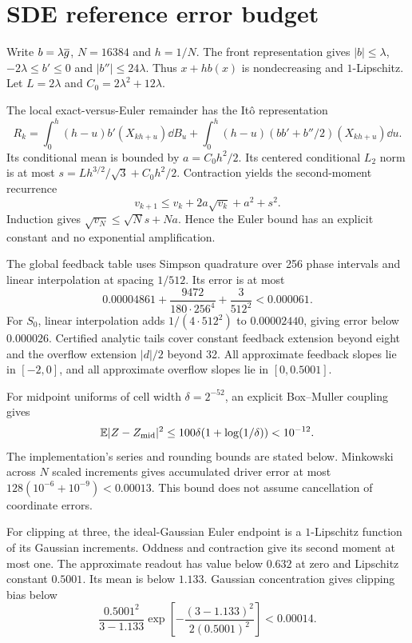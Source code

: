 \section{SDE reference error budget}\label{app:sdebudget}
Write $b=\lambda\overline g$, $N=16384$ and $h=1/N$. The front representation gives $|b|\le\lambda$, $-2\lambda\le b'\le0$ and $|b''|\le24\lambda$. Thus $x+hb(x)$ is nondecreasing and $1$-Lipschitz. Let $L=2\lambda$ and $C_0=2\lambda^2+12\lambda$.

The local exact-versus-Euler remainder has the It\^o representation
\[
 R_k=\int_0^h(h-u)b'(X_{kh+u})\dd B_u
 +\int_0^h(h-u)(bb'+b''/2)(X_{kh+u})\dd u.
\]
Its conditional mean is bounded by $a=C_0h^2/2$. Its centered conditional $L_2$ norm is at most $s=Lh^{3/2}/\sqrt3+C_0h^2/2$. Contraction yields the second-moment recurrence
\[
 v_{k+1}\le v_k+2a\sqrt{v_k}+a^2+s^2.
\]
Induction gives $\sqrt{v_N}\le\sqrt N s+Na$. Hence the Euler bound has an explicit constant and no exponential amplification.

The global feedback table uses Simpson quadrature over 256 phase intervals and linear interpolation at spacing $1/512$. Its error is at most
\[
 0.00004861+\frac{9472}{180\cdot256^4}+\frac{3}{512^2}<0.000061.
\]
For $S_0$, linear interpolation adds $1/(4\cdot512^2)$ to $0.00002440$, giving error below $0.000026$. Certified analytic tails cover constant feedback extension beyond eight and the overflow extension $|d|/2$ beyond 32. All approximate feedback slopes lie in $[-2,0]$, and all approximate overflow slopes lie in $[0,0.5001]$.

For midpoint uniforms of cell width $\delta=2^{-52}$, an explicit Box--Muller coupling gives
\[
 \mathbb E|Z-Z_{\rm mid}|^2\le100\delta(1+\log(1/\delta))<10^{-12}.
\]
The implementation's series and rounding bounds are stated below. Minkowski across $N$ scaled increments gives accumulated driver error at most
$128(10^{-6}+10^{-9})<0.00013$. This bound does not assume cancellation of coordinate errors.

For clipping at three, the ideal-Gaussian Euler endpoint is a $1$-Lipschitz function of its Gaussian increments. Oddness and contraction give its second moment at most one. The approximate readout has value below $0.632$ at zero and Lipschitz constant $0.5001$. Its mean is below $1.133$. Gaussian concentration \cite{vanhandel} gives clipping bias below
\[
 \frac{0.5001^2}{3-1.133}
 \exp\left[-\frac{(3-1.133)^2}{2(0.5001)^2}\right]<0.00014.
\]

